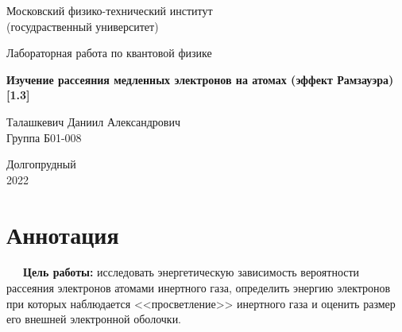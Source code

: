 \documentclass[a4paper, 12pt]{article}%
\begin{document}


\begin{titlepage}

	\newpage
	\begin{center}
		\normalsize Московский физико-технический институт \\(госудраственный 			университет)
	\end{center}

	\vspace{6em}

	\begin{center}
		\Large Лабораторная работа по квантовой физике\\
	\end{center}

	\vspace{1em}

	\begin{center}
		\large \textbf{Изучение рассеяния медленных электронов на атомах (эффект Рамзауэра) [1.3]}
	\end{center}

	\vspace{2em}

	\begin{center}
		\large Талашкевич Даниил Александрович\\
		Группа Б01-008
	\end{center}

	\vspace{\fill}

	\begin{center}
	Долгопрудный \\2022
	\end{center}
	
\end{titlepage}



	\thispagestyle{empty}
	\newpage
	\tableofcontents
	\newpage
	\setcounter{page}{1}



\section{Аннотация}

\ \ \ \textbf{Цель работы:} исследовать энергетическую зависимость вероятности рассеяния электронов атомами инертного газа, определить энергию электронов при которых наблюдается <<просветление>> инертного газа и оценить размер его внешней электронной оболочки.
\end{document}
